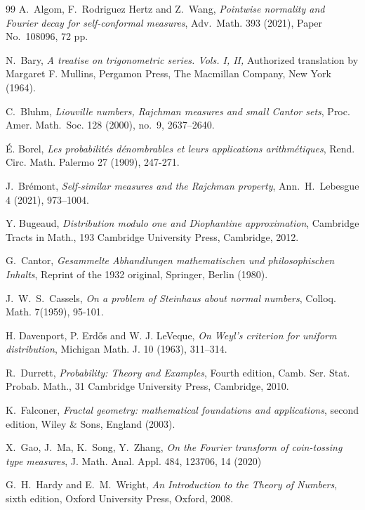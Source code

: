 \documentclass[12pt, twoside]{article}
\theoremstyle{definition}
\numberwithin{equation}{section}
\begin{document}
\begin{thebibliography}{99}
A.~Algom, F.~Rodriguez Hertz and Z.~Wang,  
{\em{Pointwise normality and Fourier decay for self-conformal measures}}, 
Adv.~Math. 393 (2021), Paper No.~108096, 72 pp. 

N.~Bary, 
{\em{A treatise on trigonometric series. Vols. I, II,}}
Authorized translation by Margaret F. Mullins, Pergamon Press, 
The Macmillan Company, New York (1964).

C.~Bluhm, 
{\em{Liouville numbers, Rajchman measures and small Cantor sets}}, 
Proc. Amer. Math.~Soc. 128 (2000), no.~9, 2637--2640.

\'{E}. Borel,
{\em{Les probabilit\'{e}s d\'{e}nombrables et leurs applications arithm\'{e}tiques}},
Rend. Circ. Math. Palermo 27 (1909), 247-271.

J.~Br\'emont, 
{\em{Self-similar measures and the Rajchman property}}, 
Ann.~H.~Lebesgue 4 (2021), 973--1004. 
	
Y. Bugeaud, 
{\em{Distribution modulo one and Diophantine approximation}},
Cambridge Tracts in Math., 193 Cambridge University Press, Cambridge, 2012.

G.~Cantor, 
{\em{Gesammelte Abhandlungen mathematischen und philosophischen Inhalts}}, 
Reprint of the 1932 original, Springer, Berlin (1980).

J.~W.~S.~Cassels, 
{\em{On a problem of Steinhaus about normal numbers}},
Colloq. Math. 7(1959), 95-101.

H. Davenport, P. Erd\H{o}s and W. J. LeVeque, 
{\em{On Weyl's criterion for uniform distribution}},
Michigan Math. J. 10 (1963), 311--314.

R.~Durrett, 
{\em{Probability: Theory and Examples}},
Fourth edition, Camb. Ser. Stat. Probab. Math., 31
Cambridge University Press, Cambridge, 2010.  

K.~Falconer, 
{\em{Fractal geometry: mathematical foundations and applications}}, second edition, 
Wiley \& Sons, England (2003).  

X.~Gao, J.~Ma, K.~Song, Y.~Zhang, 
{\em{On the Fourier transform of coin-tossing type measures}},
J. Math. Anal. Appl. 484, 123706, 14 (2020)

G.~H.~Hardy and E.~M.~Wright,  
{\em{An Introduction to the Theory of Numbers}}, sixth edition, 
Oxford University Press, Oxford, 2008.


\end{thebibliography}
\end{document}
